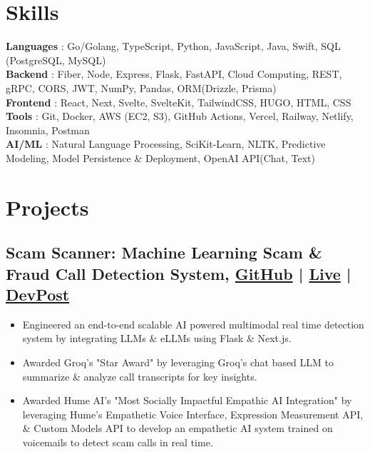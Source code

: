 \documentclass[a4,10pt]{article}
\newenvironment{zitemize}{
\begin{itemize}\itemsep0pt \parskip0pt \parsep1pt}
{\end{itemize}\vspace{-0.5cm}}
\newcommand{\hskills}[1]{
\textbf{\bfseries #1} }
\begin{document}
\section{Skills}
\hskills{Languages}: {Go/Golang, TypeScript, Python, JavaScript,  Java, Swift, SQL (PostgreSQL, MySQL)}  \\
\hskills{Backend}: {Fiber, Node, Express, Flask, FastAPI, Cloud Computing, REST, gRPC, CORS, JWT, NumPy, Pandas, ORM(Drizzle, Prisma) }  \\
\hskills{Frontend}: {React, Next, Svelte, SvelteKit, TailwindCSS, HUGO, HTML, CSS} \\
\hskills{Tools}: {Git, Docker, AWS (EC2, S3), GitHub Actions, Vercel, Railway, Netlify, Insomnia, Postman} \\
\hskills{AI/ML}: {Natural Language Processing, SciKit-Learn, NLTK, Predictive Modeling, Model Persistence \& Deployment, OpenAI API(Chat, Text)}\\
\vspace{-0.2cm}







\section{Projects} 
\subsection*{Scam Scanner: Machine Learning Scam \& Fraud Call Detection System, {\normalsize \normalfont \href{https://github.com/ScamScanners/ScamScanner}{GitHub}} | \normalsize \normalfont \href{https://scam-scanner.vercel.app/}{Live} | \normalsize \normalfont \href{https://devpost.com/software/scamscammer}{DevPost} \hfill}
\begin{zitemize}
       \item {Engineered an end-to-end scalable AI powered multimodal real time detection system by integrating LLMs \& eLLMs using Flask \& Next.js.} \\
        \item {Awarded Groq's "Star Award" by leveraging Groq's chat based LLM to summarize \& analyze call transcripts for key insights.} \\
        \item {Awarded Hume AI's "Most Socially Impactful Empathic AI Integration" by leveraging Hume's Empathetic Voice Interface, Expression Measurement API, \& Custom Models API to develop an empathetic AI system trained on voicemails to detect scam calls in real time.} \\

     \end{zitemize}
\end{document}
